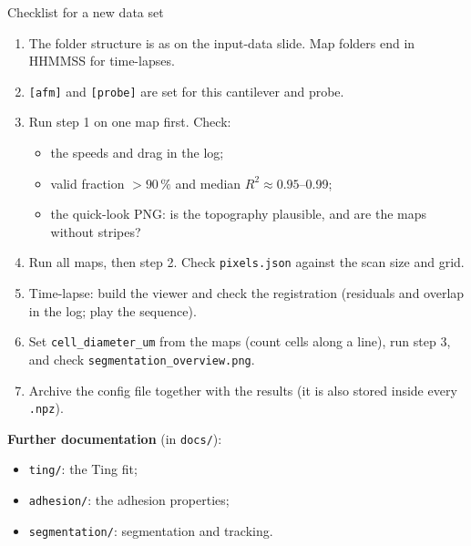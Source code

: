 \documentclass[aspectratio=169,9pt]{beamer}
\begin{document}
\begin{frame}{Checklist for a new data set}
\small
\begin{enumerate}
\item The folder structure is as on the input-data slide. Map folders end in HHMMSS for time-lapses.
\item \texttt{[afm]} and \texttt{[probe]} are set for this cantilever and probe.
\item Run step 1 on one map first. Check:
 \begin{itemize}
 \item the speeds and drag in the log;
 \item valid fraction $>90\,\%$ and median $R^2\approx0.95$--0.99;
 \item the quick-look PNG: is the topography plausible, and are the maps without stripes?
 \end{itemize}
\item Run all maps, then step 2. Check \texttt{pixels.json} against the scan size and grid.
\item Time-lapse: build the viewer and check the registration (residuals and overlap in the log; play the sequence).
\item Set \texttt{cell\_diameter\_um} from the maps (count cells along a line), run step 3, and check \texttt{segmentation\_overview.png}.
\item Archive the config file together with the results (it is also stored inside every \texttt{.npz}).
\end{enumerate}
\vspace{4pt}
\textbf{Further documentation} (in \texttt{docs/}):
\begin{itemize}
\item \texttt{ting/}: the Ting fit;
\item \texttt{adhesion/}: the adhesion properties;
\item \texttt{segmentation/}: segmentation and tracking.
\end{itemize}
\end{frame}
\end{document}
